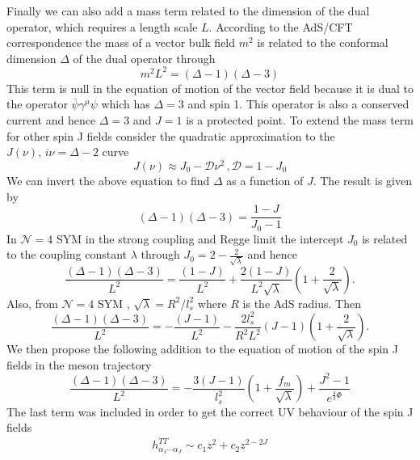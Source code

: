\documentclass[a4paper,12pt]{article}
\begin{document}
Finally we can also add a mass term related to the dimension of the dual operator, which requires a length scale $L$. According to the AdS/CFT correspondence the mass of a vector bulk field $m^2$ is related to the conformal dimension $\Delta$ of the dual operator through
\begin{equation}
m^2 L^2 = \left(\Delta - 1 \right) \left(\Delta - 3 \right)
\end{equation}
This term is null in the equation of motion of the vector field because it is dual to the operator $\bar{\psi} \gamma^\mu \psi$ which has $\Delta = 3$ and spin 1. This operator is also a conserved current and hence $\Delta = 3$ and $J = 1$ is a protected point. To extend the mass term for other spin J fields consider the quadratic approximation to the $J\left(\nu\right), \, i \nu = \Delta - 2$ curve
\begin{equation}
J\left(\nu\right) \approx J_0 - \mathcal{D} \nu^2\, , \mathcal{D} = 1 - J_0
\end{equation}
We can invert the above equation to find $\Delta$ as a function of $J$.  The result is given by
\begin{equation}
\left(\Delta -1\right) \left(\Delta - 3 \right) = \frac{1-J}{J_0 - 1}
\end{equation}
In $\mathcal{N} = 4$ SYM in the strong coupling and Regge limit the intercept $J_0$ is related to the coupling constant $\lambda$ through $J_0 = 2 - \frac{2}{\sqrt{\lambda}}$ and hence 
\begin{equation}
\frac{\left(\Delta -1\right) \left(\Delta - 3 \right)}{L^2} = \frac{\left(1-J\right)}{L^2} + \frac{2\left(1-J\right)}{L^2\sqrt{\lambda}}\left(1+\frac{2}{\sqrt{\lambda}}\right).
\end{equation}
Also, from $\mathcal{N} = 4$ SYM , $\sqrt{\lambda} = R^2 / l^2_s$ where $R$ is the AdS radius. Then
\begin{equation}
\frac{\left(\Delta -1\right) \left(\Delta - 3 \right)}{L^2} = -\frac{\left(J-1\right)}{L^2} - \frac{2 l_s^2}{R^2 L^2} \left(J-1\right) \left(1+\frac{2}{\sqrt{\lambda}}\right).
\end{equation}
We then propose the following addition to the equation of motion of the spin J fields in the meson trajectory
\begin{equation}
\frac{\left(\Delta -1\right) \left(\Delta - 3 \right)}{L^2} = -\frac{3\left(J-1\right)}{l_s^2} \left(1+\frac{f_m}{\sqrt{\lambda}}\right) + \frac{J^2 - 1}{e^{\frac{4}{3}\Phi}}
\end{equation}
The last term was included in order to get the correct UV behaviour of the spin J fields
\begin{align}
h^{TT}_{\alpha_1 \cdots \alpha_J} \sim c_1 z^2 + c_2 z^{2- 2J}
\end{align}
\end{document}
